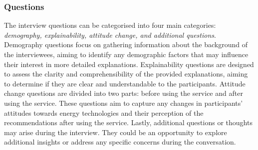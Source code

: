 \subsubsection{Questions}

The interview questions can be categorised into four main categories: \emph{demography, explainability, attitude change, and additional questions}.
Demography questions focus on gathering information about the background of the interviewees, aiming to identify any demographic factors that may influence their interest in more detailed explanations.
Explainability questions are designed to assess the clarity and comprehensibility of the provided explanations, aiming to determine if they are clear and understandable to the participants. 
Attitude change questions are divided into two parts: before using the service and after using the service. 
These questions aim to capture any changes in participants' attitudes towards energy technologies and their perception of the recommendations after using the service.
Lastly, additional questions or thoughts may arise during the interview. 
They could be an opportunity to explore additional insights or address any specific concerns during the conversation. 

